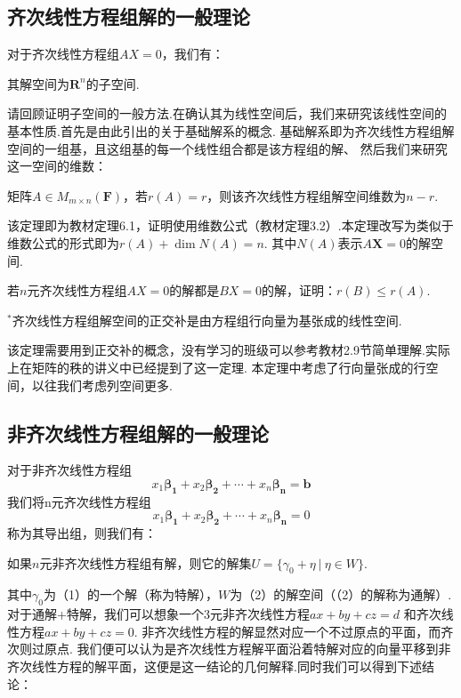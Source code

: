\subsection{齐次线性方程组解的一般理论}
对于齐次线性方程组$AX=0$，我们有：
\begin{theorem}
	其解空间为$\mathbf{R}^n$的子空间.
\end{theorem}
请回顾证明子空间的一般方法.在确认其为线性空间后，我们来研究该线性空间的基本性质.首先是由此引出的关于基础解系的概念.
基础解系即为齐次线性方程组解空间的一组基，且这组基的每一个线性组合都是该方程组的解、
然后我们来研究这一空间的维数：
\begin{theorem}
	矩阵$A \in M_{m \times n}(\mathbf{F})$，若$r(A) = r$，则该齐次线性方程组解空间维数为$n - r$.
\end{theorem}
该定理即为教材定理6.1，证明使用维数公式（教材定理3.2）.本定理改写为类似于维数公式的形式即为$r(A) + \dim N(A) = n$.
其中$N(A)$表示$A\bm{X}=0$的解空间.
\begin{example}
	若$n$元齐次线性方程组$AX = 0$的解都是$BX = 0$的解，证明：$r(B) \le r(A)$.
\end{example}
\begin{theorem}
	$^*$齐次线性方程组解空间的正交补是由方程组行向量为基张成的线性空间.
\end{theorem}
该定理需要用到正交补的概念，没有学习的班级可以参考教材2.9节简单理解.实际上在矩阵的秩的讲义中已经提到了这一定理.
本定理中考虑了行向量张成的行空间，以往我们考虑列空间更多.

\subsection{非齐次线性方程组解的一般理论}
对于非齐次线性方程组
\begin{equation}
	x_1\bm{\beta_1}+x_2\bm{\beta_2}+\cdots+x_n\bm{\beta_n}=\bm{b}
\end{equation}
我们将n元齐次线性方程组
\begin{equation}
	x_1\bm{\beta_1}+x_2\bm{\beta_2}+\cdots+x_n\bm{\beta_n}=0
\end{equation}
称为其导出组，则我们有：
\begin{theorem}
	如果$n$元非齐次线性方程组有解，则它的解集$U=\{\gamma_0+\eta\ |\ \eta \in W\}$.
\end{theorem}
其中$\gamma_0$为（1）的一个解（称为特解），$W$为（2）的解空间（（2）的解称为通解）.
对于通解+特解，我们可以想象一个3元非齐次线性方程$ax + by + cz = d$ 和齐次线性方程$ax + by + cz = 0$.
非齐次线性方程的解显然对应一个不过原点的平面，而齐次则过原点.
我们便可以认为是齐次线性方程解平面沿着特解对应的向量平移到非齐次线性方程的解平面，这便是这一结论的几何解释.同时我们可以得到下述结论：

